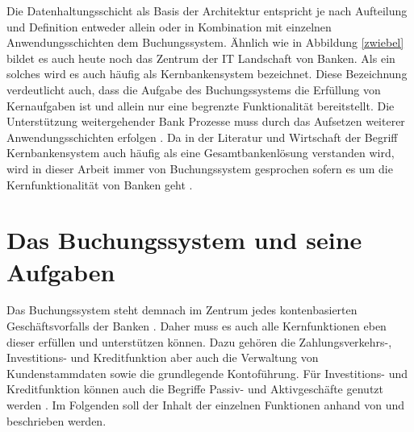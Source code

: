 \documentclass[12pt,oneside,a4paper,parskip]{scrbook}
\begin{document}
Die Datenhaltungsschicht als Basis der Architektur entspricht je nach Aufteilung und Definition entweder allein oder in Kombination mit einzelnen Anwendungsschichten dem Buchungssystem. Ähnlich wie in Abbildung \ref{zwiebel} bildet es auch heute noch das Zentrum der IT Landschaft von Banken. Als ein solches wird es auch häufig als Kernbankensystem bezeichnet. Diese Bezeichnung verdeutlicht auch, dass die Aufgabe des Buchungssystems die Erfüllung von Kernaufgaben ist und allein nur eine begrenzte Funktionalität bereitstellt. Die Unterstützung weitergehender Bank Prozesse muss durch das Aufsetzen weiterer Anwendungsschichten erfolgen \cite[58]{ITidF}. Da in der Literatur und Wirtschaft der Begriff Kernbankensystem auch häufig als eine Gesamtbankenlösung verstanden wird, wird in dieser Arbeit immer von Buchungssystem gesprochen sofern es um die Kernfunktionalität von Banken geht \cite{vergleichCoreBanking}.  


\section{Das Buchungssystem und seine Aufgaben}
Das Buchungssystem steht demnach im Zentrum jedes kontenbasierten Geschäftsvorfalls der Banken \cite{bankEnzy}. Daher muss es auch alle Kernfunktionen eben dieser erfüllen und unterstützen können. Dazu gehören die Zahlungsverkehrs-, Investitions- und Kreditfunktion aber auch die Verwaltung von Kundenstammdaten sowie die grundlegende Kontoführung. Für Investitions- und Kreditfunktion können auch die Begriffe Passiv- und Aktivgeschäfte genutzt werden \cite[12, 86]{DdF}\cite{einfuehrungKernbanksystem}. Im Folgenden soll der Inhalt der einzelnen Funktionen anhand von \cite[69-88]{DdF} und \cite[91-153]{bankwirtschaft} beschrieben werden.
\end{document}
